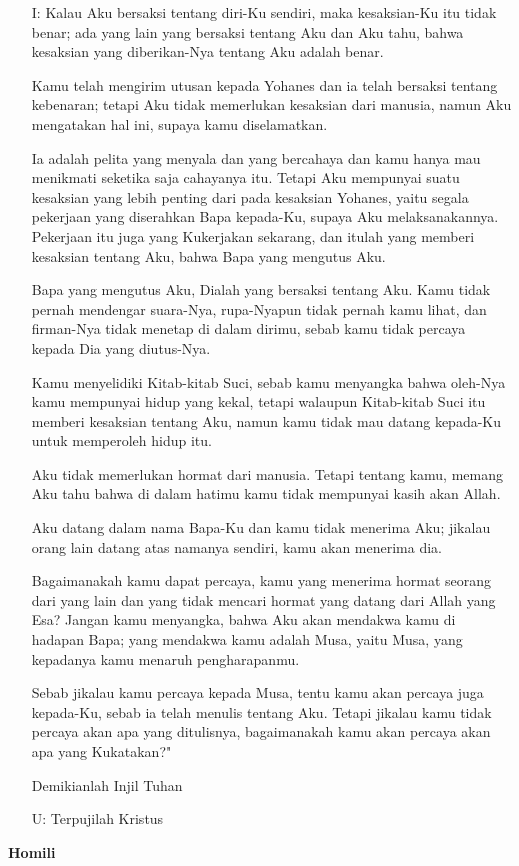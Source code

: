 \documentclass[12pt,twoside]{book}
\makeatletter
\newcommand{\subjudul}[1]{%
  {\parindent \z@ \normalfont
    \interlinepenalty\@M \bfseries #1\par\nobreak \vskip 20\p@ }}
\newcommand{\BU}[1]{\begin{itemize} \item[U:] #1 \end{itemize}}
\newcommand{\BI}[1]{\begin{itemize} \item[I:] #1 \end{itemize}}
\makeatother
\begin{document}
\BI{Kalau Aku bersaksi tentang diri-Ku sendiri, maka kesaksian-Ku itu tidak benar;
ada yang lain yang bersaksi tentang Aku dan Aku tahu, bahwa kesaksian yang diberikan-Nya tentang Aku adalah benar.

Kamu telah mengirim utusan kepada Yohanes dan ia telah bersaksi tentang kebenaran;
tetapi Aku tidak memerlukan kesaksian dari manusia, namun Aku mengatakan hal ini, supaya kamu diselamatkan.

Ia adalah pelita yang menyala dan yang bercahaya dan kamu hanya mau menikmati seketika saja cahayanya itu.
Tetapi Aku mempunyai suatu kesaksian yang lebih penting dari pada kesaksian Yohanes, yaitu segala pekerjaan yang diserahkan Bapa kepada-Ku, supaya Aku melaksanakannya. Pekerjaan itu juga yang Kukerjakan sekarang, dan itulah yang memberi kesaksian tentang Aku, bahwa Bapa yang mengutus Aku.

Bapa yang mengutus Aku, Dialah yang bersaksi tentang Aku. Kamu tidak pernah mendengar suara-Nya, rupa-Nyapun tidak pernah kamu lihat,
dan firman-Nya tidak menetap di dalam dirimu, sebab kamu tidak percaya kepada Dia yang diutus-Nya.

Kamu menyelidiki Kitab-kitab Suci, sebab kamu menyangka bahwa oleh-Nya kamu mempunyai hidup yang kekal, tetapi walaupun Kitab-kitab Suci itu memberi kesaksian tentang Aku,
namun kamu tidak mau datang kepada-Ku untuk memperoleh hidup itu.

Aku tidak memerlukan hormat dari manusia.
Tetapi tentang kamu, memang Aku tahu bahwa di dalam hatimu kamu tidak mempunyai kasih akan Allah.

Aku datang dalam nama Bapa-Ku dan kamu tidak menerima Aku; jikalau orang lain datang atas namanya sendiri, kamu akan menerima dia.

Bagaimanakah kamu dapat percaya, kamu yang menerima hormat seorang dari yang lain dan yang tidak mencari hormat yang datang dari Allah yang Esa?
Jangan kamu menyangka, bahwa Aku akan mendakwa kamu di hadapan Bapa; yang mendakwa kamu adalah Musa, yaitu Musa, yang kepadanya kamu menaruh pengharapanmu.

Sebab jikalau kamu percaya kepada Musa, tentu kamu akan percaya juga kepada-Ku, sebab ia telah menulis tentang Aku.
Tetapi jikalau kamu tidak percaya akan apa yang ditulisnya, bagaimanakah kamu akan percaya akan apa yang Kukatakan?"

Demikianlah Injil Tuhan}

\BU{Terpujilah Kristus}


\subjudul{Homili}
\end{document}
